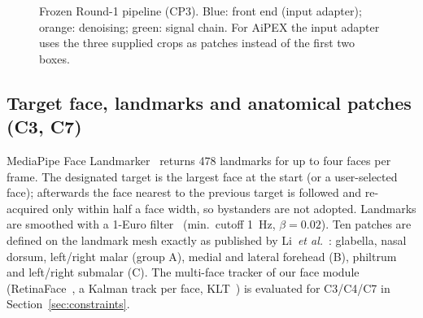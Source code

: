 \documentclass[conference]{IEEEtran}
\begin{document}
\begin{figure}[t]
\centering
{}
\caption{Frozen Round-1 pipeline (CP3). Blue: front end (input adapter); orange: denoising; green: signal chain.
For AiPEX the input adapter uses the three supplied crops as patches instead of the first two boxes.}
\label{fig:pipeline}
\end{figure}

\subsection{Target face, landmarks and anatomical patches (C3, C7)}
MediaPipe Face Landmarker~\cite{kartynnik2019facemesh} returns 478 landmarks for up to four faces per frame. The designated
target is the largest face at the start (or a user-selected face); afterwards the face nearest to the previous target is
followed and re-acquired only within half a face width, so bystanders are not adopted. Landmarks are smoothed with a
1-Euro filter~\cite{casiez2012oneeuro} (min.\ cutoff \SI{1}{Hz}, $\beta=0.02$). Ten patches are defined on the landmark
mesh exactly as published by Li~\emph{et al.}~\cite{li2026roi}: glabella, nasal dorsum, left/right malar (group A), medial and
lateral forehead (B), philtrum and left/right submalar (C). The multi-face tracker of our face module
(RetinaFace~\cite{deng2020retinaface}, a Kalman track per face, KLT~\cite{shi1994good}) is evaluated for C3/C4/C7 in
Section~\ref{sec:constraints}.
\end{document}
